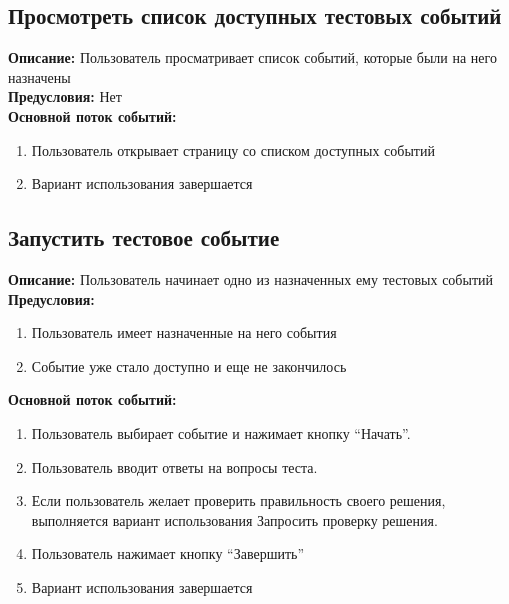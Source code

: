 \documentclass{article}
\begin{document}


    \subsection{Просмотреть список доступных тестовых событий}
    \textbf{Описание:} Пользователь просматривает список событий, которые были на него назначены\\
    \textbf{Предусловия:} Нет\\
    \textbf{Основной поток событий:}
    \begin{enumerate}
        \item Пользователь открывает страницу со списком доступных событий
        \item Вариант использования завершается
    \end{enumerate}


    \subsection{Запустить тестовое событие}
    \textbf{Описание:} Пользователь начинает одно из назначенных ему тестовых
    событий\\
    \textbf{Предусловия:} 
    \begin{enumerate}
        \item Пользователь имеет назначенные на него события
        \item Событие уже стало доступно и еще не закончилось
    \end{enumerate}
    \textbf{Основной поток событий:}
    \begin{enumerate}
        \item Пользователь выбирает событие и нажимает кнопку “Начать”.
        \item Пользователь вводит ответы на вопросы теста.
        \item Если пользователь желает проверить правильность своего решения, выполняется вариант использования Запросить проверку решения.
        \item Пользователь нажимает кнопку “Завершить”
        \item Вариант использования завершается    
    \end{enumerate}
\end{document}
